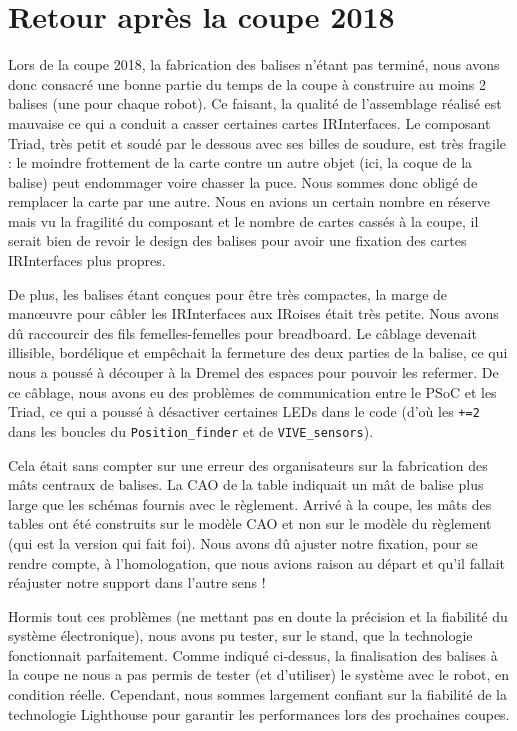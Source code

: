 ﻿
\section{Retour après la coupe 2018}

Lors de la coupe 2018, la fabrication des balises n'étant pas terminé, nous avons donc consacré une bonne partie du temps de la coupe à construire au moins 2 balises (une pour chaque robot). Ce faisant, la qualité de l'assemblage réalisé est mauvaise ce qui a conduit a casser certaines cartes IRInterfaces. Le composant Triad, très petit et soudé par le dessous avec ses billes de soudure, est très fragile : le moindre frottement de la carte contre un autre objet (ici, la coque de la balise) peut endommager voire chasser la puce. Nous sommes donc obligé de remplacer la carte par une autre. Nous en avions un certain nombre en réserve mais vu la fragilité du composant et le nombre de cartes cassés à la coupe, il serait bien de revoir le design des balises pour avoir une fixation des cartes IRInterfaces plus propres.

De plus, les balises étant conçues pour être très compactes, la marge de manœuvre pour câbler les IRInterfaces aux IRoises était très petite. Nous avons dû raccourcir des fils femelles-femelles pour breadboard. Le câblage devenait illisible, bordélique et empêchait la fermeture des deux parties de la balise, ce qui nous a poussé à découper à la Dremel des espaces pour pouvoir les refermer. De ce câblage, nous avons eu des problèmes de communication entre le PSoC et les Triad, ce qui a poussé à désactiver certaines LEDs dans le code (d'où les \verb|+=2| dans les boucles du \verb|Position_finder| et de \verb|VIVE_sensors|).

Cela était sans compter sur une erreur des organisateurs sur la fabrication des mâts centraux de balises. La CAO de la table indiquait un mât de balise plus large que les schémas fournis avec le règlement. Arrivé à la coupe, les mâts des tables ont été construits sur le modèle CAO et non sur le modèle du règlement (qui est la version qui fait foi). Nous avons dû ajuster notre fixation, pour se rendre compte, à l'homologation, que nous avions raison au départ et qu'il fallait réajuster notre support dans l'autre sens !

Hormis tout ces problèmes (ne mettant pas en doute la précision et la fiabilité du système électronique), nous avons pu tester, sur le stand, que la technologie fonctionnait parfaitement. Comme indiqué ci-dessus, la finalisation des balises à la coupe ne nous a pas permis de tester (et d'utiliser) le système avec le robot, en condition réelle. Cependant, nous sommes largement confiant sur la fiabilité de la technologie Lighthouse pour garantir les performances lors des prochaines coupes.
